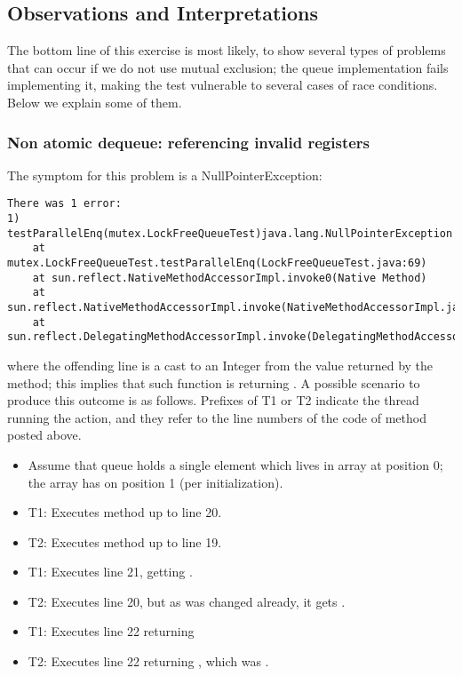 \subsection{Observations and Interpretations}
The bottom line of this exercise is most likely, to show several types
of problems that can occur if we do not use mutual exclusion; the
queue implementation fails implementing it, making the test vulnerable
to several cases of race conditions. Below we explain some of them.

\subsubsection{Non atomic dequeue: referencing invalid registers}

The symptom for this problem is a NullPointerException: \\

\begin{verbatim}
There was 1 error:
1) testParallelEnq(mutex.LockFreeQueueTest)java.lang.NullPointerException
	at mutex.LockFreeQueueTest.testParallelEnq(LockFreeQueueTest.java:69)
	at sun.reflect.NativeMethodAccessorImpl.invoke0(Native Method)
	at sun.reflect.NativeMethodAccessorImpl.invoke(NativeMethodAccessorImpl.java:62)
	at sun.reflect.DelegatingMethodAccessorImpl.invoke(DelegatingMethodAccessorImpl.java:43)
\end{verbatim}
\hfill

where the offending line is a cast to an Integer from the value
returned by the  method; this implies that such function is
returning . A possible scenario to produce this outcome is as
follows. Prefixes of T1 or T2 indicate the thread running the action,
and they refer to the line numbers of the code of method 
posted above.

\begin{itemize}
\item Assume that queue holds a single element which lives in 
  array at position 0; the array has  on position 1 (per
  initialization).
\item T1: Executes method up to line 20. 
\item T2: Executes method up to line 19. 
\item T1: Executes line 21, getting . 
\item T2: Executes line 20, but as  was changed already, it
  gets .  
\item T1: Executes line 22 returning 
\item T2: Executes line 22 returning , which was .
\end{itemize}
\hfill

